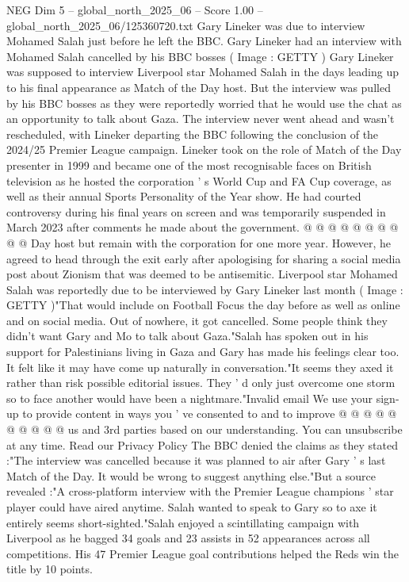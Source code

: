 \begin{textsample}{NEG Dim 5 – global\_north\_2025\_06 – Score 1.00 – global\_north\_2025\_06/125360720.txt}  \label{ex:f5_neg_385}
Gary Lineker was due to interview Mohamed Salah just before he left the BBC.
Gary Lineker had an interview with Mohamed Salah cancelled by his BBC bosses ( Image : GETTY ) Gary Lineker was supposed to interview Liverpool star Mohamed Salah in the days leading up to his final appearance as Match of the Day host.
But the interview was pulled by his BBC bosses as they were reportedly worried that he would use the chat as an opportunity to talk about Gaza.
The interview never went ahead and wasn't rescheduled, with Lineker departing the BBC following the conclusion of the 2024/25 Premier League campaign.
Lineker took on the role of Match of the Day presenter in 1999 and became one of the most recognisable faces on British television as he hosted the corporation ' s World Cup and FA Cup coverage, as well as their annual Sports Personality of the Year show.
He had courted controversy during his final years on screen and was temporarily suspended in March 2023 after comments he made about the government. @ @ @ @ @ @ @ @ @ @ Day host but remain with the corporation for one more year.
However, he agreed to head through the exit early after apologising for sharing a social media post about Zionism that was deemed to be antisemitic.
Liverpool star Mohamed Salah was reportedly due to be interviewed by Gary Lineker last month ( Image : GETTY )"That would include on Football Focus the day before as well as online and on social media.
Out of nowhere, it got cancelled.
Some people think they didn't want Gary and Mo to talk about Gaza."Salah has spoken out in his support for Palestinians living in Gaza and Gary has made his feelings clear too.
It felt like it may have come up naturally in conversation."It seems they axed it rather than risk possible editorial issues.
They ' d only just overcome one storm so to face another would have been a nightmare."Invalid email We use your sign-up to provide content in ways you ' ve consented to and to improve @ @ @ @ @ @ @ @ @ @ us and 3rd parties based on our understanding.
You can unsubscribe at any time.
Read our Privacy Policy The BBC denied the claims as they stated :"The interview was cancelled because it was planned to air after Gary ' s last Match of the Day.
It would be wrong to suggest anything else."But a source revealed :"A cross-platform interview with the Premier League champions ' star player could have aired anytime.
Salah wanted to speak to Gary so to axe it entirely seems short-sighted."Salah enjoyed a scintillating campaign with Liverpool as he bagged 34 goals and 23 assists in 52 appearances across all competitions.
His 47 Premier League goal contributions helped the Reds win the title by 10 points.

\end{textsample}
